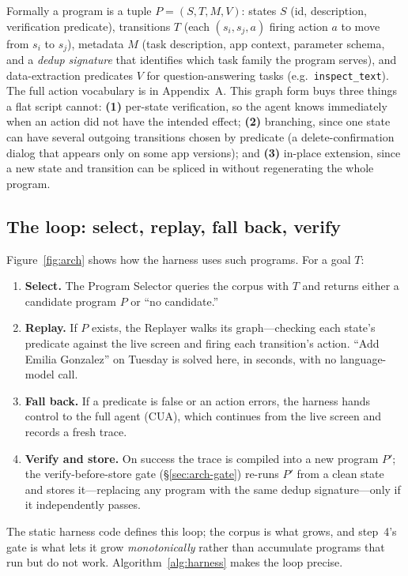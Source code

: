 \documentclass[11pt]{article}
\begin{document}
Formally a program is a tuple $P=(S,T,M,V)$: states $S$ (id, description, verification predicate), transitions $T$ (each $(s_i, s_j, a)$ firing action $a$ to move from $s_i$ to $s_j$), metadata $M$ (task description, app context, parameter schema, and a \emph{dedup signature} that identifies which task family the program serves), and data-extraction predicates $V$ for question-answering tasks (e.g.\ \texttt{inspect\_text}). The full action vocabulary is in Appendix~A. This graph form buys three things a flat script cannot: \textbf{(1)} per-state verification, so the agent knows immediately when an action did not have the intended effect; \textbf{(2)} branching, since one state can have several outgoing transitions chosen by predicate (a delete-confirmation dialog that appears only on some app versions); and \textbf{(3)} in-place extension, since a new state and transition can be spliced in without regenerating the whole program.

\subsection{The loop: select, replay, fall back, verify}
\label{sec:arch-loop}

Figure~\ref{fig:arch} shows how the harness uses such programs. For a goal $T$:

\begin{enumerate}[leftmargin=2em]\tightlist
\item \textbf{Select.} The Program Selector queries the corpus with $T$ and returns either a candidate program $P$ or ``no candidate.''
\item \textbf{Replay.} If $P$ exists, the Replayer walks its graph---checking each state's predicate against the live screen and firing each transition's action. ``Add Emilia Gonzalez'' on Tuesday is solved here, in seconds, with no language-model call.
\item \textbf{Fall back.} If a predicate is false or an action errors, the harness hands control to the full agent (CUA), which continues from the live screen and records a fresh trace.
\item \textbf{Verify and store.} On success the trace is compiled into a new program $P'$; the verify-before-store gate (\S\ref{sec:arch-gate}) re-runs $P'$ from a clean state and stores it---replacing any program with the same dedup signature---only if it independently passes.
\end{enumerate}

The static harness code defines this loop; the corpus is what grows, and step~4's gate is what lets it grow \emph{monotonically} rather than accumulate programs that run but do not work. Algorithm~\ref{alg:harness} makes the loop precise.
\end{document}
